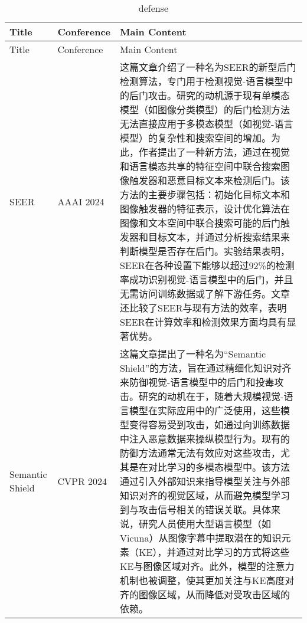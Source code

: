 \documentclass[lettersize,journal]{IEEEtran}
\begin{document}
\begin{longtable}{|p{3.5cm}|p{2cm}|p{10.5cm}|}
\end{longtable}

\newpage
\onecolumn
\begin{longtable}{|p{3.5cm}|p{2cm}|p{10.5cm}|} 
    \caption{defense}
    \label{tabl:defense} \\ \hline
    Title & Conference & Main Content \\ \hline
    \endfirsthead \hline
    Title & Conference & Main Content \\ \hline 
    \endhead \hline
    SEER\cite{zhu2024seer} & AAAI 2024 & 这篇文章介绍了一种名为SEER的新型后门检测算法，专门用于检测视觉-语言模型中的后门攻击。研究的动机源于现有单模态模型（如图像分类模型）的后门检测方法无法直接应用于多模态模型（如视觉-语言模型）的复杂性和搜索空间的增加。为此，作者提出了一种新方法，通过在视觉和语言模态共享的特征空间中联合搜索图像触发器和恶意目标文本来检测后门。该方法的主要步骤包括：初始化目标文本和图像触发器的特征表示，设计优化算法在图像和文本空间中联合搜索可能的后门触发器和目标文本，并通过分析搜索结果来判断模型是否存在后门。实验结果表明，SEER在各种设置下能够以超过92\%的检测率成功识别视觉-语言模型中的后门，并且无需访问训练数据或了解下游任务。文章还比较了SEER与现有方法的效率，表明SEER在计算效率和检测效果方面均具有显著优势。\\ \hline

    Semantic Shield\cite{ishmam2024semantic} & CVPR 2024 & 这篇文章提出了一种名为“Semantic Shield”的方法，旨在通过精细化知识对齐来防御视觉-语言模型中的后门和投毒攻击。研究的动机在于，随着大规模视觉-语言模型在实际应用中的广泛使用，这些模型变得容易受到攻击，如通过向训练数据中注入恶意数据来操纵模型行为。现有的防御方法通常无法有效应对这些攻击，尤其是在对比学习的多模态模型中。该方法通过引入外部知识来指导模型关注与外部知识对齐的视觉区域，从而避免模型学习到与攻击信号相关的错误关联。具体来说，研究人员使用大型语言模型（如Vicuna）从图像字幕中提取潜在的知识元素（KE），并通过对比学习的方式将这些KE与图像区域对齐。此外，模型的注意力机制也被调整，使其更加关注与KE高度对齐的图像区域，从而降低对受攻击区域的依赖。\\ \hline


\end{longtable}
\end{document}
